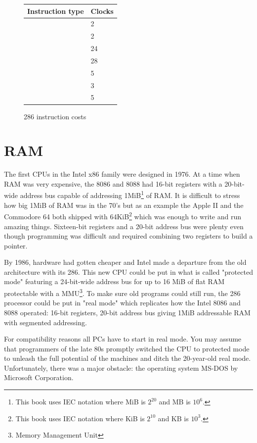 \documentclass[book.tex]{subfiles}
\begin{document}
  \begin{figure}[H]
\centering  
\begin{tabularx}{\textwidth}{ X  Y }
  \toprule
  \textbf{Instruction type} &  \textbf{Clocks} \\
  \toprule 
    & 2  \\
    & 2  \\
    & 24  \\
    & 28 \\
    & 5 \\
    & 3 \\
    & 5 \\
  \toprule
\end{tabularx}
\caption{286 instruction costs\protect\footnotemark}
\end{figure}
\addtocounter{footnote}{-1}







\section{RAM}
The first CPUs in the Intel x86 family were designed in 1976. At a time when RAM was very expensive, the 8086 and 8088 had 16-bit registers with a 20-bit-wide address bus capable of addressing 1MiB\footnote{This book uses IEC notation where MiB is $2^{20}$ and MB is $10^6$.} of RAM. It is difficult to stress how big 1MiB of RAM was in the 70's but as an example the Apple II and the Commodore 64 both shipped with 64KiB\footnote{This book uses IEC notation where KiB is $2^{10}$ and KB is $10^3$.} which was enough to write and run amazing things. Sixteen-bit registers and a 20-bit address bus were plenty even though programming was difficult and required combining two registers to build a pointer.\\
\par
By 1986, hardware had gotten cheaper and Intel made a departure from the old architecture with its 286. This new CPU could be put in what is called "protected mode" featuring a 24-bit-wide address bus for up to 16 MiB of flat RAM protectable with a MMU\footnote{Memory Management Unit}. To make sure old programs could still run, the 286 processor could be put in "real mode" which replicates how the Intel 8086 and 8088 operated: 16-bit registers, 20-bit address bus giving 1MiB addressable RAM with segmented addressing.\\
\par
For compatibility reasons all PCs have to start in real mode. You may assume that programmers of the late 80s promptly switched the CPU to protected mode to unleash the full potential of the machines and ditch the 20-year-old real mode. Unfortunately, there was a major obstacle: the operating system MS-DOS by Microsoft Corporation.
  
\end{document}
